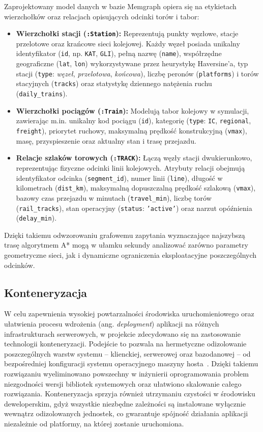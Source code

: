 \documentclass[twoside]{projektInzynierskiMS1z}
\begin{document}
Zaprojektowany model danych w bazie Memgraph opiera się na etykietach wierzchołków
oraz relacjach opisujących odcinki torów i tabor:
\begin{itemize}
\item \textbf{Wierzchołki stacji (\texttt{:Station}):} Reprezentują punkty węzłowe, stacje przelotowe
oraz krańcowe sieci kolejowej. Każdy węzeł posiada unikalny identyfikator (\texttt{id}, np. \texttt{KAT},
\texttt{GLI}), pełną nazwę (\texttt{name}), współrzędne geograficzne (\texttt{lat}, \texttt{lon})
wykorzystywane przez heurystykę Haversine'a, typ stacji (\texttt{type}: \emph{węzeł}, \emph{przelotowa},
\emph{końcowa}), liczbę peronów (\texttt{platforms}) i torów stacyjnych (\texttt{tracks}) oraz
statystykę dziennego natężenia ruchu (\texttt{daily\_trains}).
\item \textbf{Wierzchołki pociągów (\texttt{:Train}):} Modelują tabor kolejowy w symulacji,
zawierając m.in. unikalny kod pociągu (\texttt{id}), kategorię (\texttt{type}: \texttt{IC},
\texttt{regional}, \texttt{freight}), priorytet ruchowy, maksymalną prędkość konstrukcyjną
(\texttt{vmax}), masę, przyspieszenie oraz aktualny stan i trasę przejazdu.
\item \textbf{Relacje szlaków torowych (\texttt{:TRACK}):} Łączą węzły stacji dwukierunkowo,
reprezentując fizyczne odcinki linii kolejowych. Atrybuty relacji obejmują identyfikator
odcinka (\texttt{segment\_id}), numer linii (\texttt{line}), długość w kilometrach (\texttt{dist\_km}),
maksymalną dopuszczalną prędkość szlakową (\texttt{vmax}), bazowy czas przejazdu w minutach
(\texttt{travel\_min}), liczbę torów (\texttt{rail\_tracks}), stan operacyjny
(\texttt{status}: \texttt{'active'}) oraz narzut opóźnienia (\texttt{delay\_min}).
\end{itemize}
Dzięki takiemu odwzorowaniu grafowemu zapytania wyznaczające najszybszą trasę algorytmem A*
mogą w ułamku sekundy analizować zarówno parametry geometryczne sieci, jak i dynamiczne
ograniczenia eksploatacyjne poszczególnych odcinków.

\subsection{Konteneryzacja}

W celu zapewnienia wysokiej powtarzalności środowiska uruchomieniowego oraz ułatwienia
procesu wdrożenia (ang. \emph{deployment}) aplikacji na różnych infrastrukturach
serwerowych, w projekcie zdecydowano się na zastosowanie technologii konteneryzacji.
Podejście to pozwala na hermetyczne odizolowanie poszczególnych warstw systemu --
klienckiej, serwerowej oraz bazodanowej -- od bezpośredniej konfiguracji systemu
operacyjnego maszyny hosta~\cite{docker}. Dzięki takiemu rozwiązaniu wyeliminowano
powszechny w inżynierii oprogramowania problem niezgodności wersji bibliotek systemowych
oraz ułatwiono skalowanie całego rozwiązania. Konteneryzacja sprzyja również utrzymaniu
czystości w środowisku deweloperskim, gdyż wszystkie niezbędne zależności są instalowane
wyłącznie wewnątrz odizolowanych jednostek, co gwarantuje spójność działania aplikacji
niezależnie od platformy, na której zostanie uruchomiona.
\end{document}
